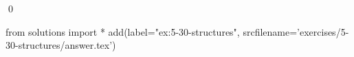 
\begin{ex}
  \label{ex:5-30-structures}
  
  \qed
\end{ex}
\begin{python0}
from solutions import *
add(label="ex:5-30-structures",
    srcfilename='exercises/5-30-structures/answer.tex')
\end{python0}
